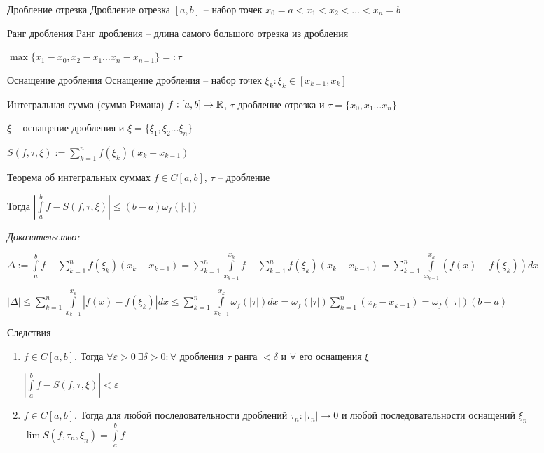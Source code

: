 \documentclass[12pt]{article}
\begin{document}
\begin{defin}{Дробление отрезка}
    Дробление отрезка $[a, b]$ -- набор точек $x_0 = a < x_1 < x_2 < \ldots < x_n = b$
\end{defin}

\begin{defin}{Ранг дробления}
    Ранг дробления -- длина самого большого отрезка из дробления

    $\max\{x_1 - x_0, x_2 - x_1 \ldots x_n - x_{n - 1}\} =: \tau$
\end{defin}

\begin{defin}{Оснащение дробления}
    Оснащение дробления -- набор точек $\xi_k : \xi_k \in [x_{k - 1}, x_k]$
\end{defin}

\begin{defin}{Интегральная сумма (сумма Римана)}
    $f : [a, b] \to \mathbb R$, $\tau$ дробление отрезка и $\tau = \{ x_0, x_1 \ldots x_n \}$

    $\xi$ -- оснащение дробления и $\xi = \{ \xi_1, \xi_2 \ldots \xi_n \}$

    $S(f, \tau, \xi) := \sum\limits_{k = 1}^n f(\xi_k)(x_k - x_{k - 1})$
\end{defin}

\begin{theo}{Теорема об интегральных суммах}
    $f \in C[a, b]$, $\tau$ -- дробление

    Тогда $|\int\limits_a^b f - S(f, \tau, \xi)| \leq (b - a)\omega_f(|\tau|)$
\end{theo}

\textit{Доказательство:}

$\Delta := \int\limits_a^b f - \sum\limits_{k = 1}^n f(\xi_k)(x_k - x_{k - 1}) = \sum\limits_{k = 1}^n \int\limits_{x_{k - 1}}^{x_k} f - \sum\limits_{k = 1}^n f(\xi_k)(x_k - x_{k - 1}) = \sum\limits_{k = 1}^n \int\limits_{x_{k - 1}}^{x_k} (f(x) - f(\xi_k))dx$

$|\Delta| \leq \sum\limits_{k = 1}^n \int\limits_{x_{k - 1}}^{x_k} |f(x) - f(\xi_k)|dx \leq \sum\limits_{k = 1}^n \int\limits_{x_{k - 1}}^{x_k} \omega_f(|\tau|)dx = \omega_f(|\tau|) \sum\limits_{k = 1}^n (x_k - x_{k - 1}) = \omega_f(|\tau|)(b - a)$

\begin{theo}{Следствия}
    \begin{enumerate}
        \item $f \in C[a, b]$. Тогда $\forall \varepsilon > 0\ \exists \delta > 0 : \forall$ дробления $\tau$ ранга $< \delta$ и $\forall$ его оснащения $\xi$
        
        $|\int\limits_a^b f - S(f, \tau, \xi)| < \varepsilon$

        \item $f \in C[a, b]$. Тогда для любой последовательности дроблений $\tau_n : |\tau_n| \to 0$ и любой последовательности оснащений $\xi_n$ $\lim S(f, \tau_n, \xi_n) = \int\limits_a^b f$
    \end{enumerate}
\end{theo}
\end{document}
